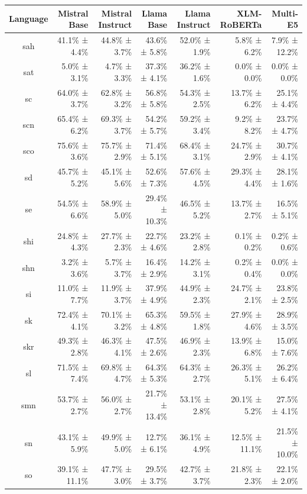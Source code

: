 \documentclass[10pt, a4paper]{article}
\begin{document}
\begin{table}[h]
\centering
\scriptsize
\begin{tabular}{crrrrrr}
\toprule
Language & Mistral Base & Mistral Instruct & Llama Base & Llama Instruct & XLM-RoBERTa & Multi-E5 \\
\midrule
sah & 41.1\% ± 4.4\% & 44.8\% ± 3.7\% & 43.6\% ± 5.8\% & 52.0\% ± 1.9\% & 5.8\% ± 6.2\% & 7.9\% ± 12.2\% \\
sat & 5.0\% ± 3.1\% & 4.7\% ± 3.3\% & 37.3\% ± 4.1\% & 36.2\% ± 1.6\% & 0.0\% ± 0.0\% & 0.0\% ± 0.0\% \\
sc & 64.0\% ± 3.7\% & 62.8\% ± 3.2\% & 56.8\% ± 5.8\% & 54.3\% ± 2.5\% & 13.7\% ± 6.2\% & 25.1\% ± 4.4\% \\
scn & 65.4\% ± 6.2\% & 69.3\% ± 3.7\% & 54.2\% ± 5.7\% & 59.2\% ± 3.4\% & 9.2\% ± 8.2\% & 23.7\% ± 4.7\% \\
sco & 75.6\% ± 3.6\% & 75.7\% ± 2.9\% & 71.4\% ± 5.1\% & 68.4\% ± 3.1\% & 24.7\% ± 2.9\% & 30.7\% ± 4.1\% \\
sd & 45.7\% ± 5.2\% & 45.1\% ± 5.6\% & 52.6\% ± 7.3\% & 57.6\% ± 4.5\% & 29.3\% ± 4.4\% & 28.1\% ± 1.6\% \\
se & 54.5\% ± 6.6\% & 58.9\% ± 5.0\% & 29.4\% ± 10.3\% & 46.5\% ± 5.2\% & 13.7\% ± 2.7\% & 16.5\% ± 5.1\% \\
shi & 24.8\% ± 4.3\% & 27.7\% ± 2.3\% & 22.7\% ± 4.6\% & 23.2\% ± 2.8\% & 0.1\% ± 0.2\% & 0.2\% ± 0.6\% \\
shn & 3.2\% ± 3.6\% & 5.7\% ± 3.7\% & 16.4\% ± 2.9\% & 14.2\% ± 3.1\% & 0.2\% ± 0.4\% & 0.0\% ± 0.0\% \\
si & 11.0\% ± 7.7\% & 11.9\% ± 3.7\% & 37.9\% ± 4.9\% & 44.9\% ± 2.3\% & 24.7\% ± 2.1\% & 23.8\% ± 2.5\% \\
sk & 72.4\% ± 4.1\% & 70.1\% ± 3.2\% & 65.3\% ± 4.8\% & 59.5\% ± 1.8\% & 27.9\% ± 4.6\% & 28.9\% ± 3.5\% \\
skr & 49.3\% ± 2.8\% & 46.3\% ± 4.1\% & 47.5\% ± 2.6\% & 46.9\% ± 2.3\% & 13.9\% ± 6.8\% & 15.0\% ± 7.6\% \\
sl & 71.5\% ± 7.4\% & 69.8\% ± 4.7\% & 64.3\% ± 5.3\% & 64.3\% ± 2.7\% & 26.3\% ± 5.1\% & 26.2\% ± 6.4\% \\
smn & 53.7\% ± 2.7\% & 56.0\% ± 2.7\% & 21.7\% ± 13.4\% & 53.1\% ± 2.8\% & 20.1\% ± 5.2\% & 27.5\% ± 4.1\% \\
sn & 43.1\% ± 5.9\% & 49.9\% ± 5.0\% & 12.7\% ± 6.1\% & 36.1\% ± 4.9\% & 12.5\% ± 11.1\% & 21.5\% ± 10.0\% \\
so & 39.1\% ± 11.1\% & 47.7\% ± 3.0\% & 29.5\% ± 3.7\% & 42.7\% ± 3.7\% & 21.8\% ± 2.3\% & 22.1\% ± 2.0\% \\

\end{tabular}
\end{table}
\end{document}
